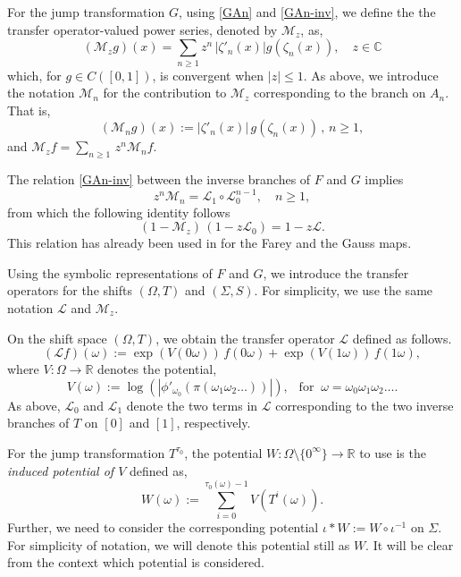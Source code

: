 \documentclass{amsart}
\theoremstyle{definition}
\theoremstyle{remark}
\theoremstyle{definition}
\numberwithin{equation}{section}
\newcommand{\R}{\mathbb R}
\newcommand{\C}{\mathbb C}
\newcommand{\CL}{{\mathcal L}}
\newcommand{\CM}{{\mathcal M}}
\begin{document}
For the jump transformation $G$, using \eqref{GAn} and \eqref{GAn-inv}, we define the the transfer operator-valued power series, denoted by $\CM_z$, as,
\[
        (\CM_z g) (x) = \sum\limits_{n\ge 1} z^n\, |\zeta'_{n}(x)| g(\zeta_{n}(x)),\quad z\in \C
\]
which, for $g\in C([0,1])$, is convergent when $|z|\le 1$. As above, we introduce the notation $\CM_n$ for the contribution to $\CM_z$ corresponding to the branch on $A_{n}$. That is,
\[
        (\CM_n g)(x) := |\zeta'_{n}(x)|\, g(\zeta_{n}(x))\, , \, n\ge 1,
\]
and $\CM_z f = \sum_{n\ge 1}\, z^n \CM_n f$.

The relation \eqref{GAn-inv} between the inverse branches of $F$ and $G$ implies
\[
z^n \CM_n = \CL_1 \circ \CL_0^{n-1}, \quad n\ge 1,
\]
from which the following identity follows
\begin{equation}\label{rel-to-FG}
(1-\CM_z)\, (1-z\CL_0) = 1-z\CL.
\end{equation}
This relation has already been used in \cite{BI} for the Farey and the Gauss maps.

Using the symbolic representations of $F$ and $G$, we introduce the transfer operators for the shifts $(\Omega,T)$ and $(\Sigma, S)$. For simplicity, we use the same notation $\CL$ and $\CM_z$.

On the shift space $(\Omega, T)$, we obtain the transfer operator $\CL$ defined as follows.
\[
        (\CL f)(\omega) := \exp ({V}(0\omega)) \,f(0\omega)+\exp (V(1\omega)) \, f(1\omega),
\]
where $V : \Omega \to \R$ denotes the potential,
\begin{equation}\label{pot-V}
        V(\omega) := \log (|\phi'_{\omega_{0}}(\pi(\omega_{1} \omega_{2} \dots))|),  \ \ \text{ for } \  \omega= \omega_{0} \omega_{1} \omega_{2} \dots .
\end{equation}
As above, $\CL_0$ and $\CL_1$ denote the two terms in $\CL$ corresponding to the two inverse branches of $T$ on $[0]$ and $[1]$, respectively.
 
For the jump transformation $T^{\tau_0}$, the potential $W:\Omega \setminus\{0^{\infty}\} \to \R$ to use is the \emph{induced potential of $V$} defined as, 
\begin{equation}\label{eq:jump_potential}
        W(\omega) := \sum\limits_{i=0}^{\tau_{0}(\omega)-1}V(T^{i}(\omega)).
\end{equation}
 Further, we need to consider the corresponding potential $\iota *W := W \circ \iota^{-1}$ on $\Sigma$. For simplicity of notation, we will denote this potential still as $W$. It will be clear from the context which potential is considered. 
 
\end{document}
